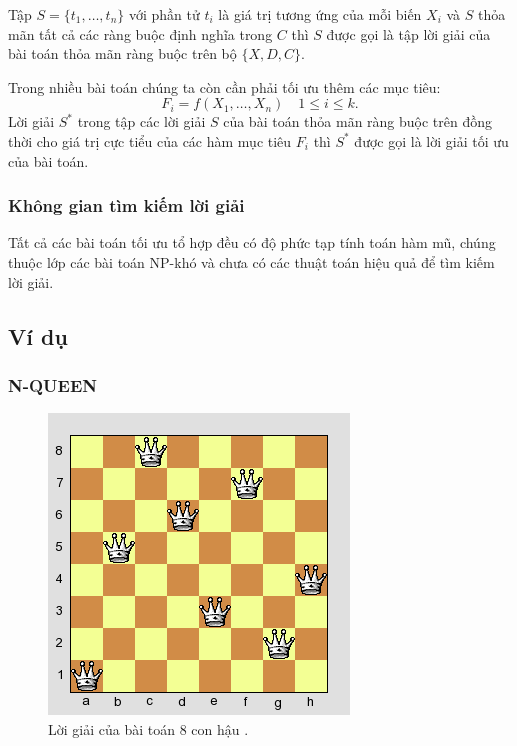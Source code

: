 Tập $S = \{t_1,\dotsc, t_n\}$ với phần tử $t_i$ là giá trị tương ứng của mỗi biến $X_i$ và $S$ thỏa mãn tất cả các ràng buộc định nghĩa trong $C$ thì $S$ được gọi là tập lời giải của bài toán thỏa mãn ràng buộc trên bộ $\{X, D, C\}$.

Trong nhiều bài toán chúng ta còn cần phải tối ưu thêm các mục tiêu:
\begin{equation}
F_i = f(X_1,\dotsc, X_n) \quad 1 \leq i \leq k.
\end{equation}
Lời giải $S^*$ trong tập các lời giải $S$ của bài toán thỏa mãn ràng buộc trên đồng thời cho giá trị cực tiểu của các hàm mục tiêu $F_i$ thì $S^*$ được gọi là lời giải tối ưu của bài toán.

\subsubsection*{Không gian tìm kiếm lời giải}
Tất cả các bài toán tối ưu tổ hợp đều có độ phức tạp tính toán hàm mũ, chúng thuộc lớp các bài toán \textsf{NP-khó} và chưa có các thuật toán hiệu quả để tìm kiếm lời giải.

\subsection{Ví dụ}

\subsubsection*{N-QUEEN}

\begin{figure}
	\centering
	\includegraphics[scale=1]{figures/10-queens-sol.png}
	\caption{Lời giải của bài toán 8 con hậu \cite{PaulButler2009queens}.\label{fig:queens}}
\end{figure}

